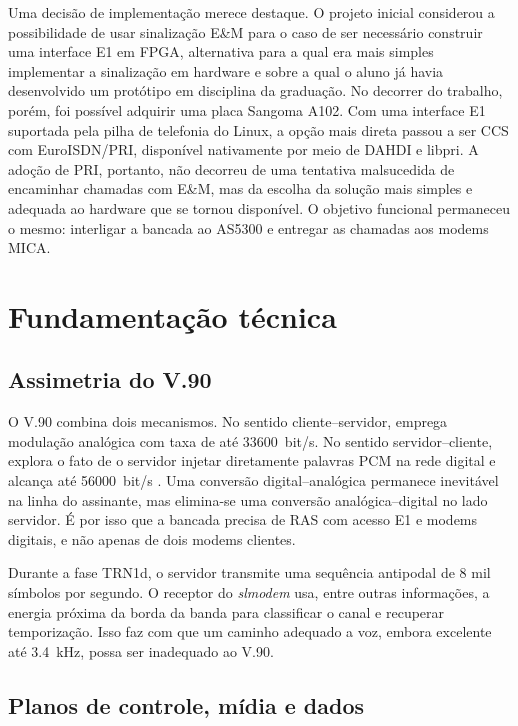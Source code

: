 \documentclass[12pt,a4paper]{article}
\newcommand{\slmodem}{\textit{slmodem}}
\begin{document}
Uma decisão de implementação merece destaque. O projeto inicial considerou a possibilidade
de usar sinalização E\&M para o caso de ser necessário construir uma interface E1
em FPGA, alternativa para a qual era mais simples implementar a sinalização em
hardware e sobre a qual o aluno já havia desenvolvido um protótipo em disciplina
da graduação. No decorrer do trabalho, porém, foi possível adquirir uma placa Sangoma
A102. Com uma interface E1 suportada pela pilha de telefonia do Linux, a opção mais
direta passou a ser CCS com EuroISDN/PRI, disponível nativamente por meio de
DAHDI e libpri. A adoção de PRI, portanto, não decorreu de uma tentativa malsucedida
de encaminhar chamadas com E\&M, mas da escolha da solução mais simples e adequada
ao hardware que se tornou disponível. O objetivo funcional permaneceu o mesmo:
interligar a bancada ao AS5300 e entregar as chamadas aos modems MICA.

\section{Fundamentação técnica}

\subsection{Assimetria do V.90}

O V.90 combina dois mecanismos. No sentido cliente--servidor, emprega modulação
analógica com taxa de até \SI{33600}{bit/s}. No sentido servidor--cliente,
explora o fato de o servidor injetar diretamente palavras PCM na rede digital e
alcança até \SI{56000}{bit/s} \cite{itutv90}. Uma conversão digital--analógica
permanece inevitável na linha do assinante, mas elimina-se uma conversão analógica--digital
no lado servidor. É por isso que a bancada precisa de RAS com acesso E1 e
modems digitais, e não apenas de dois modems clientes.

Durante a fase TRN1d, o servidor transmite uma sequência antipodal de 8 mil
símbolos por segundo. O receptor do \slmodem{} usa, entre outras informações,
a energia próxima da borda da banda para classificar o canal e recuperar
temporização. Isso faz com que um caminho adequado a voz, embora excelente até
\SI{3.4}{kHz}, possa ser inadequado ao V.90.

\subsection{Planos de controle, mídia e dados}
\end{document}

